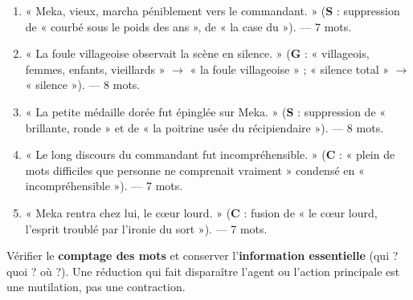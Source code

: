 \documentclass[11pt]{article}
\begin{document}
\begin{corrige}
\begin{enumerate}
    \item « Meka, vieux, marcha péniblement vers le commandant. » (\textbf{S} : suppression de « courbé sous le poids des ans », de « la case du »). — 7 mots.
    \item « La foule villageoise observait la scène en silence. » (\textbf{G} : « villageois, femmes, enfants, vieillards » $\to$ « la foule villageoise » ; « silence total » $\to$ « silence »). — 8 mots.
    \item « La petite médaille dorée fut épinglée sur Meka. » (\textbf{S} : suppression de « brillante, ronde » et de « la poitrine usée du récipiendaire »). — 8 mots.
    \item « Le long discours du commandant fut incompréhensible. » (\textbf{C} : « plein de mots difficiles que personne ne comprenait vraiment » condensé en « incompréhensible »). — 7 mots.
    \item « Meka rentra chez lui, le cœur lourd. » (\textbf{C} : fusion de « le cœur lourd, l'esprit troublé par l'ironie du sort »). — 7 mots.
\end{enumerate}
\end{corrige}

\begin{attention}
Vérifier le \textbf{comptage des mots} et conserver l'\textbf{information essentielle} (qui ? quoi ? où ?). Une réduction qui fait disparaître l'agent ou l'action principale est une mutilation, pas une contraction.
\end{attention}
\end{document}
